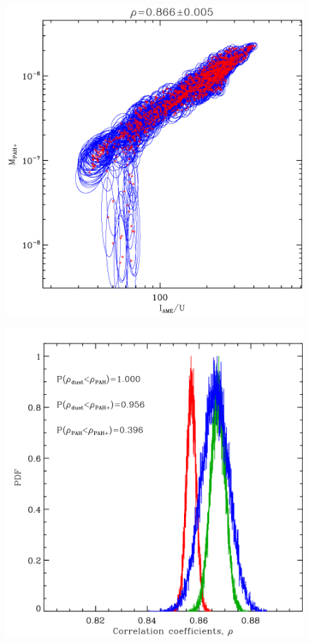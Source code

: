    \begin{figure}
      \includegraphics[width=\textwidth/2]{../Plots/ch_lori/fred_LOri_notes_Oct2017_fig2d.pdf}
      \centering
      \caption{ }
      \label{fig:fred_LOri_notes_Oct2017_fig2d}
    \end{figure}

    \begin{figure}
      \includegraphics[width=\textwidth/2]{../Plots/ch_lori/fred_LOri_notes_Oct2017_fig2c.pdf}
      \centering
      \caption{ }
      \label{fig:fred_LOri_notes_Oct2017_fig2c}
    \end{figure}

